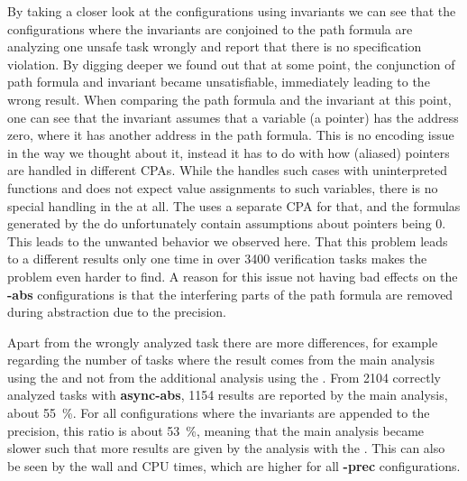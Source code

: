By taking a closer look at the configurations using invariants we can see that the configurations where the invariants are conjoined to the path formula are analyzing one unsafe task wrongly and report 
that there is no specification violation. By digging deeper we found out that at some point, the conjunction of path formula and invariant became unsatisfiable, immediately leading to the wrong result.
When comparing the path formula and the invariant at this point, one can see that the invariant assumes that a variable (a pointer) has the address zero, where it has another address in the path formula.
This is no encoding issue in the way we thought about it, instead it has to do with how (aliased) pointers are handled in different \acp{CPA}. While the \PredicateCPA{} handles such cases with
uninterpreted functions and does not expect value assignments to such variables, there is no special handling in the \InvariantsCPA{} at all. The \InvariantsCPA{} uses a separate \ac{CPA} for that, and the formulas generated by the \InvariantsCPA{} do 
unfortunately contain assumptions about pointers being 0.\,
This leads to the unwanted behavior we observed here. That this problem leads to a different results only one time in over \num{3400} verification tasks makes the problem 
even harder to find. A reason for this issue not having bad effects on the \textbf{-abs} configurations is that the interfering parts of the path formula are removed during abstraction due to the 
precision.
\setcounter{sidenote}{58}


Apart from the wrongly analyzed task there are more differences, for example regarding the number of tasks where the result comes from the main analysis using the \PredicateCPA{} and not from the additional 
analysis using the \InvariantsCPA{}. From \num{2104} correctly analyzed tasks with \textbf{async-abs}, \num{1154} results are reported by the main analysis, about \SI{55}{\percent}. For all configurations where the invariants 
are appended to the precision, this ratio is about \SI{53}{\percent}, meaning that the main analysis became slower such that more results are given by the analysis with the \InvariantsCPA{}. This can also be seen 
by the wall and CPU times, which are higher for all \textbf{-prec} configurations.

